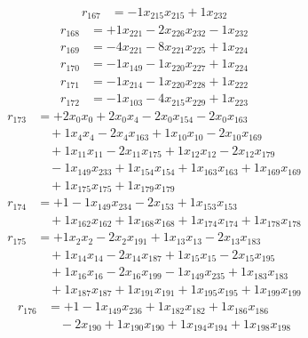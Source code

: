 \[\begin{aligned}
r_{167} &= - 1 x_{215} x_{215} + 1 x_{232}
\end{aligned}\]
\[\begin{aligned}
r_{168} &= + 1 x_{221} - 2 x_{226} x_{232} - 1 x_{232}
\end{aligned}\]
\[\begin{aligned}
r_{169} &= - 4 x_{221} - 8 x_{221} x_{225} + 1 x_{224}
\end{aligned}\]
\[\begin{aligned}
r_{170} &= - 1 x_{149} - 1 x_{220} x_{227} + 1 x_{224}
\end{aligned}\]
\[\begin{aligned}
r_{171} &= - 1 x_{214} - 1 x_{220} x_{228} + 1 x_{222}
\end{aligned}\]
\[\begin{aligned}
r_{172} &= - 1 x_{103} - 4 x_{215} x_{229} + 1 x_{223}
\end{aligned}\]
\[\begin{aligned}
r_{173} &= + 2 x_{0} x_{0} + 2 x_{0} x_{4} - 2 x_{0} x_{154} - 2 x_{0} x_{163} \\
 &\quad + 1 x_{4} x_{4} - 2 x_{4} x_{163} + 1 x_{10} x_{10} - 2 x_{10} x_{169} \\
 &\quad + 1 x_{11} x_{11} - 2 x_{11} x_{175} + 1 x_{12} x_{12} - 2 x_{12} x_{179} \\
 &\quad - 1 x_{149} x_{233} + 1 x_{154} x_{154} + 1 x_{163} x_{163} + 1 x_{169} x_{169} \\
 &\quad + 1 x_{175} x_{175} + 1 x_{179} x_{179}
\end{aligned}\]
\[\begin{aligned}
r_{174} &= + 1 - 1 x_{149} x_{234} - 2 x_{153} + 1 x_{153} x_{153} \\
 &\quad + 1 x_{162} x_{162} + 1 x_{168} x_{168} + 1 x_{174} x_{174} + 1 x_{178} x_{178}
\end{aligned}\]
\[\begin{aligned}
r_{175} &= + 1 x_{2} x_{2} - 2 x_{2} x_{191} + 1 x_{13} x_{13} - 2 x_{13} x_{183} \\
 &\quad + 1 x_{14} x_{14} - 2 x_{14} x_{187} + 1 x_{15} x_{15} - 2 x_{15} x_{195} \\
 &\quad + 1 x_{16} x_{16} - 2 x_{16} x_{199} - 1 x_{149} x_{235} + 1 x_{183} x_{183} \\
 &\quad + 1 x_{187} x_{187} + 1 x_{191} x_{191} + 1 x_{195} x_{195} + 1 x_{199} x_{199}
\end{aligned}\]
\[\begin{aligned}
r_{176} &= + 1 - 1 x_{149} x_{236} + 1 x_{182} x_{182} + 1 x_{186} x_{186} \\
 &\quad - 2 x_{190} + 1 x_{190} x_{190} + 1 x_{194} x_{194} + 1 x_{198} x_{198}
\end{aligned}\]
